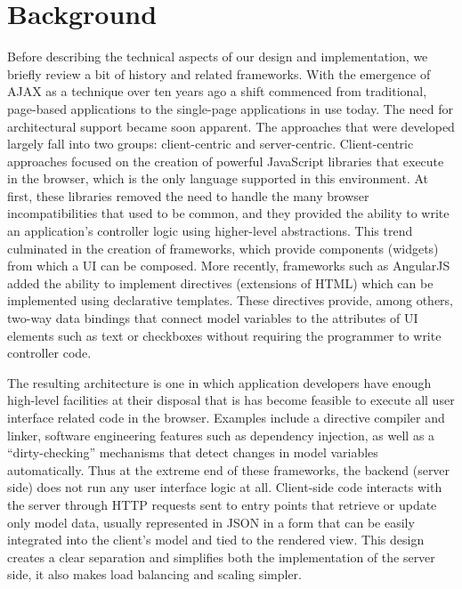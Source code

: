 \section{Background}
\label{sec:background}

Before describing the technical aspects of our design and implementation,
we briefly review a bit of history and related frameworks.
With the emergence of AJAX as a technique over ten years ago a shift commenced from traditional,
page-based applications to the single-page applications in use today. 
The need for architectural support became soon apparent.  The approaches 
that were developed largely fall into two groups: client-centric and server-centric.
Client-centric approaches focused on the creation of powerful JavaScript
libraries that execute in the browser, which is the only language supported
in this environment.  At first, these libraries removed the 
need to handle the many browser incompatibilities that used to be common, 
and they provided the ability to write an application's controller logic 
using higher-level abstractions.  This trend culminated in the creation of 
frameworks, which provide components (widgets) from which a UI can be
composed.  More recently, frameworks such as AngularJS added the ability
to implement directives (extensions of HTML) which can be implemented using 
declarative templates.  These directives provide, among others, two-way data 
bindings that connect model variables to the attributes of UI elements such 
as text or checkboxes without requiring the programmer to write controller
code.

The resulting architecture is one in which application developers have enough
high-level facilities at their disposal that is has become feasible to execute 
all user interface related code in the browser.   
Examples include a directive compiler and linker, software engineering features 
such as dependency injection, as well as a ``dirty-checking'' mechanisms that 
detect changes in model variables automatically.
Thus at the extreme end of these frameworks, the backend 
(server side) does not run any user interface logic at all.  Client-side code
interacts with the server through HTTP requests sent to entry points that
retrieve or update only model data, usually represented in JSON in a form
that can be easily integrated into the client's model and tied to the rendered 
view.  This design creates a clear separation and simplifies both the implementation
of the server side, it also makes load balancing and scaling simpler.


